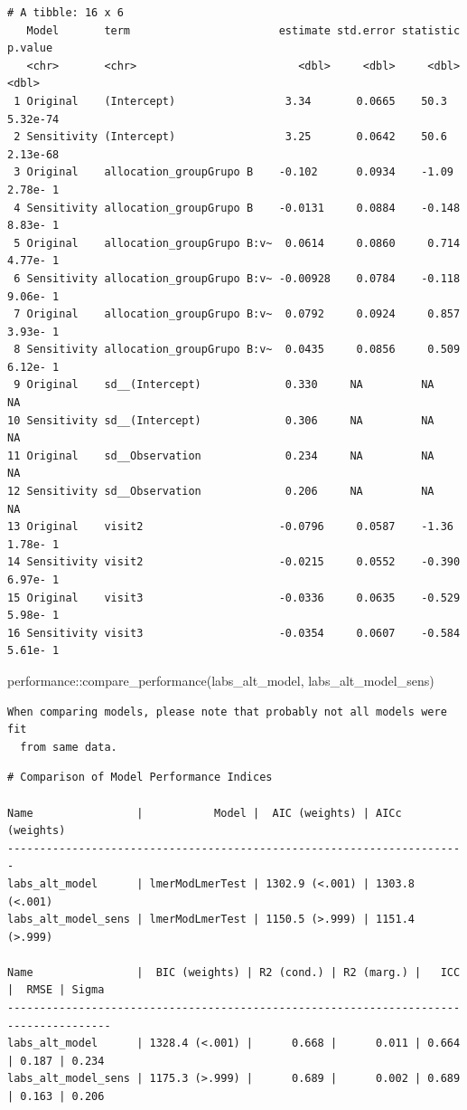 \documentclass[
  letterpaper,
  DIV=11,
  numbers=noendperiod]{scrartcl}
\newenvironment{Shaded}{\begin{snugshade}}{\end{snugshade}}
\newcommand{\FunctionTok}[1]{\textcolor[rgb]{0.28,0.35,0.67}{#1}}
\newcommand{\NormalTok}[1]{\textcolor[rgb]{0.00,0.23,0.31}{#1}}
\newcommand{\SpecialCharTok}[1]{\textcolor[rgb]{0.37,0.37,0.37}{#1}}
\begin{document}
\begin{verbatim}
# A tibble: 16 x 6
   Model       term                       estimate std.error statistic   p.value
   <chr>       <chr>                         <dbl>     <dbl>     <dbl>     <dbl>
 1 Original    (Intercept)                 3.34       0.0665    50.3    5.32e-74
 2 Sensitivity (Intercept)                 3.25       0.0642    50.6    2.13e-68
 3 Original    allocation_groupGrupo B    -0.102      0.0934    -1.09   2.78e- 1
 4 Sensitivity allocation_groupGrupo B    -0.0131     0.0884    -0.148  8.83e- 1
 5 Original    allocation_groupGrupo B:v~  0.0614     0.0860     0.714  4.77e- 1
 6 Sensitivity allocation_groupGrupo B:v~ -0.00928    0.0784    -0.118  9.06e- 1
 7 Original    allocation_groupGrupo B:v~  0.0792     0.0924     0.857  3.93e- 1
 8 Sensitivity allocation_groupGrupo B:v~  0.0435     0.0856     0.509  6.12e- 1
 9 Original    sd__(Intercept)             0.330     NA         NA     NA       
10 Sensitivity sd__(Intercept)             0.306     NA         NA     NA       
11 Original    sd__Observation             0.234     NA         NA     NA       
12 Sensitivity sd__Observation             0.206     NA         NA     NA       
13 Original    visit2                     -0.0796     0.0587    -1.36   1.78e- 1
14 Sensitivity visit2                     -0.0215     0.0552    -0.390  6.97e- 1
15 Original    visit3                     -0.0336     0.0635    -0.529  5.98e- 1
16 Sensitivity visit3                     -0.0354     0.0607    -0.584  5.61e- 1
\end{verbatim}

\begin{Shaded}
\begin{Highlighting}[]
\NormalTok{performance}\SpecialCharTok{::}\FunctionTok{compare\_performance}\NormalTok{(labs\_alt\_model, labs\_alt\_model\_sens)}
\end{Highlighting}
\end{Shaded}

\begin{verbatim}
When comparing models, please note that probably not all models were fit
  from same data.
\end{verbatim}

\begin{verbatim}
# Comparison of Model Performance Indices

Name                |           Model |  AIC (weights) | AICc (weights)
-----------------------------------------------------------------------
labs_alt_model      | lmerModLmerTest | 1302.9 (<.001) | 1303.8 (<.001)
labs_alt_model_sens | lmerModLmerTest | 1150.5 (>.999) | 1151.4 (>.999)

Name                |  BIC (weights) | R2 (cond.) | R2 (marg.) |   ICC |  RMSE | Sigma
--------------------------------------------------------------------------------------
labs_alt_model      | 1328.4 (<.001) |      0.668 |      0.011 | 0.664 | 0.187 | 0.234
labs_alt_model_sens | 1175.3 (>.999) |      0.689 |      0.002 | 0.689 | 0.163 | 0.206
\end{verbatim}
\end{document}
